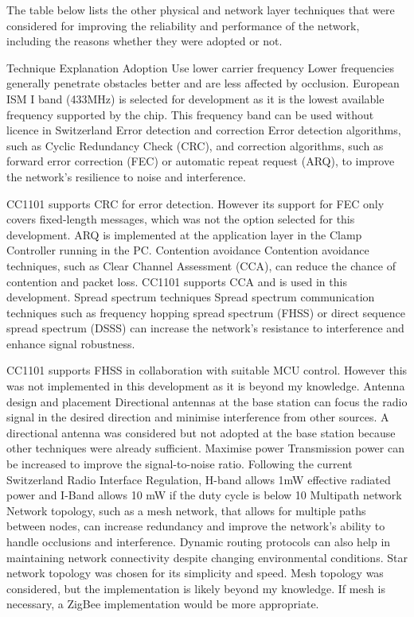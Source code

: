 The table below lists the other physical and network layer techniques that were considered for improving the reliability and performance of the network, including the reasons whether they were adopted or not.

Technique
Explanation
Adoption
Use lower carrier frequency
Lower frequencies generally penetrate obstacles better and are less affected by occlusion.
European ISM I band (433MHz) is selected for development as it is the lowest available frequency supported by the chip. This frequency band can be used without licence in Switzerland \parencite{ofcomRadioInterfaceRegulation2020}
Error detection and correction
Error detection algorithms, such as Cyclic Redundancy Check (CRC), and correction algorithms, such as forward error correction (FEC) or automatic repeat request (ARQ), to improve the network's resilience to noise and interference.



CC1101 supports CRC for error detection. However its support for FEC only covers fixed-length messages, which was not the option selected for this development. 
ARQ is implemented at the application layer in the Clamp Controller running in the PC.
Contention avoidance
Contention avoidance techniques, such as Clear Channel
Assessment (CCA), can reduce the chance of contention and packet loss. 
CC1101 supports CCA and is used in this development.
Spread spectrum techniques
Spread spectrum communication techniques such as frequency hopping spread spectrum (FHSS) or direct sequence spread spectrum (DSSS) can increase the network's resistance to interference and enhance signal robustness.


CC1101 supports FHSS in collaboration with suitable MCU control. However this was not implemented in this development as it is beyond my knowledge.
Antenna design and placement
Directional antennas at the base station can focus the radio signal in the desired direction and minimise interference from other sources. 
A directional antenna was considered but not adopted at the base station because other techniques were already sufficient.
Maximise power
Transmission power can be increased to improve the signal-to-noise ratio. 
Following the current Switzerland
Radio Interface Regulation, 
H-band allows 1mW effective
radiated power and I-Band allows 10 mW if the duty cycle is below 10%
Multipath network
Network topology, such as a mesh network, that allows for multiple paths between nodes, can increase redundancy and improve the network's ability to handle occlusions and interference. Dynamic routing protocols can also help in maintaining network connectivity despite changing environmental conditions.
Star network topology was chosen for its simplicity and speed. Mesh topology was considered, but the implementation is likely beyond my knowledge. If mesh is necessary, a ZigBee implementation would be more appropriate.


